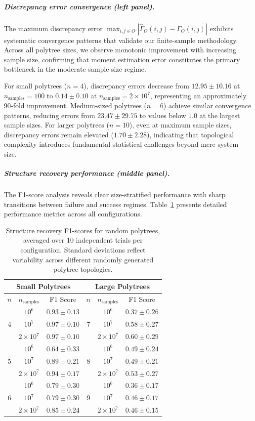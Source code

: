 \documentclass[11pt,a4paper]{article}
\numberwithin{equation}{section}
\begin{document}
\subparagraph{Discrepancy error convergence (left panel).} The maximum discrepancy error $\max_{i,j \in O} |\hat{\Gamma}_O(i,j) - \Gamma_O(i,j)|$ exhibits systematic convergence patterns that validate our finite-sample methodology. Across all polytree sizes, we observe monotonic improvement with increasing sample size, confirming that moment estimation error constitutes the primary bottleneck in the moderate sample size regime.

For small polytrees ($n=4$), discrepancy errors decrease from $12.95 \pm 10.16$ at $n_{\text{samples}} = 100$ to $0.14 \pm 0.10$ at $n_{\text{samples}} = 2 \times 10^7$, representing an approximately 90-fold improvement. Medium-sized polytrees ($n=6$) achieve similar convergence patterns, reducing errors from $23.47 \pm 29.75$ to values below $1.0$ at the largest sample sizes. For larger polytrees ($n=10$), even at maximum sample sizes, discrepancy errors remain elevated ($1.70 \pm 2.28$), indicating that topological complexity introduces fundamental statistical challenges beyond mere system size.

\subparagraph{Structure recovery performance (middle panel).} The F1-score analysis reveals clear size-stratified performance with sharp transitions between failure and success regimes. Table~\ref{tab:random_polytree_summary} presents detailed performance metrics across all configurations.

\begin{table}[h]
\centering
\caption{Structure recovery F1-scores for random polytrees, averaged over 10 independent trials per configuration. Standard deviations reflect variability across different randomly generated polytree topologies.}
\label{tab:random_polytree_summary}
\small
\begin{tabular}{ccc|ccc}
\toprule
\multicolumn{3}{c}{Small Polytrees} & \multicolumn{3}{c}{Large Polytrees} \\
\midrule
$n$ & $n_{\text{samples}}$ & F1 Score & $n$ & $n_{\text{samples}}$ & F1 Score \\
\midrule
\multirow{3}{*}{4} & $10^6$ & $0.93 \pm 0.13$ & \multirow{3}{*}{7} & $10^6$ & $0.37 \pm 0.26$ \\
 & $10^7$ & $0.97 \pm 0.10$ &  & $10^7$ & $0.58 \pm 0.27$ \\
 & $2 \times 10^7$ & $0.97 \pm 0.10$ &  & $2 \times 10^7$ & $0.60 \pm 0.29$ \\
\midrule
\multirow{3}{*}{5} & $10^6$ & $0.64 \pm 0.33$ & \multirow{3}{*}{8} & $10^6$ & $0.49 \pm 0.24$ \\
 & $10^7$ & $0.89 \pm 0.21$ &  & $10^7$ & $0.49 \pm 0.21$ \\
 & $2 \times 10^7$ & $0.94 \pm 0.17$ &  & $2 \times 10^7$ & $0.53 \pm 0.27$ \\
\midrule
\multirow{3}{*}{6} & $10^6$ & $0.79 \pm 0.30$ & \multirow{3}{*}{9} & $10^6$ & $0.36 \pm 0.17$ \\
 & $10^7$ & $0.79 \pm 0.30$ &  & $10^7$ & $0.46 \pm 0.17$ \\
 & $2 \times 10^7$ & $0.85 \pm 0.24$ &  & $2 \times 10^7$ & $0.46 \pm 0.15$ \\
\bottomrule
\end{tabular}
\end{table}
\end{document}
